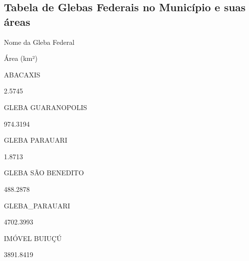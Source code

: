 \documentclass[
  letterpaper,
]{report}
\begin{document}
\hypertarget{tabela-de-glebas-federais-no-municuxedpio-e-suas-uxe1reas}{%
\subsection{Tabela de Glebas Federais no Município e suas
áreas}\label{tabela-de-glebas-federais-no-municuxedpio-e-suas-uxe1reas}}

\n  

\n    

\n      

Nome da Gleba Federal

\n      

Área (km²)

\n    

\n  

\n  

\n    

\n      

ABACAXIS

\n      

2.5745

\n    

\n    

\n      

GLEBA GUARANOPOLIS

\n      

974.3194

\n    

\n    

\n      

GLEBA PARAUARI

\n      

1.8713

\n    

\n    

\n      

GLEBA SÃO BENEDITO

\n      

488.2878

\n    

\n    

\n      

GLEBA\_PARAUARI

\n      

4702.3993

\n    

\n    

\n      

IMÓVEL BUIUÇÚ

\n      

3891.8419
\end{document}
